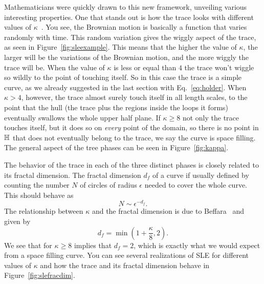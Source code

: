 Mathematicians were quickly drawn to this new framework, unveiling various
interesting properties. One that stands out is how the trace looks with
different values of $\kappa$~\cite{Rohde2011}. You see, the Brownian motion is
basically a function that varies randomly with time. This random variation
gives the wiggly aspect of the trace, as seen in Figure~\ref{fig:sleexample}.
This means that the higher the value of $\kappa$, the larger will be the
variations of the Brownian motion, and the more wiggly the trace will be. When
the value of $\kappa$ is less or equal than $4$ the trace won't wiggle so
wildly to the point of touching itself. So in this case the trace is a simple
curve, as we already suggested in the last section with Eq.~\ref{eq:holder}.
When $\kappa>4$, however, the trace almost surely touch itself in all length
scales, to the point that the hull (the trace plus the regions inside the loops
it forms) eventually swallows the whole upper half plane. If $\kappa\geq8$ not
only the trace touches itself, but it does so on \textit{every} point of the
domain, so there is no point in $\mathbb{H}$ that does not eventually belong to the
trace, we say the curve is space filling. The general aspect of the tree phases
can be seen in Figure~\ref{fig:kappa}.

The behavior of the trace in each of the three distinct phases is closely
related to its fractal dimension. The fractal dimension $d_f$ of a curve if
usually defined by counting the number $N$ of circles of radius $\epsilon$
needed to cover the whole curve. This should behave as
\begin{equation}
    N\sim \epsilon^{-d_f}.
\end{equation}
The relationship between $\kappa$ and the fractal dimension is due to
Beffara~\cite{Beffara2008} and given by
\begin{equation}
    d_f=\min\left(1+\frac{\kappa}{8},2\right).
\end{equation}
We see that for $\kappa\geq 8$ implies that $d_f=2$, which is exactly what we
would expect from a space filling curve. You can see several realizations of
SLE for different values of $\kappa$ and how the trace and its fractal
dimension behave in Figure~\ref{fig:slefracdim}.

